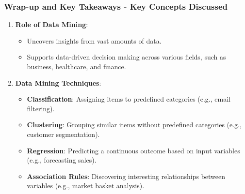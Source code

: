 \documentclass[aspectratio=169]{beamer}
\begin{document}
\begin{frame}[fragile]
    \frametitle{Wrap-up and Key Takeaways - Key Concepts Discussed}
    \begin{enumerate}
        \item \textbf{Role of Data Mining}:
            \begin{itemize}
                \item Uncovers insights from vast amounts of data.
                \item Supports data-driven decision making across various fields, such as business, healthcare, and finance.
            \end{itemize}

        \item \textbf{Data Mining Techniques}:
            \begin{itemize}
                \item \textbf{Classification}: Assigning items to predefined categories (e.g., email filtering).
                \item \textbf{Clustering}: Grouping similar items without predefined categories (e.g., customer segmentation).
                \item \textbf{Regression}: Predicting a continuous outcome based on input variables (e.g., forecasting sales).
                \item \textbf{Association Rules}: Discovering interesting relationships between variables (e.g., market basket analysis).
            \end{itemize}
    \end{enumerate}
\end{frame}
\end{document}
